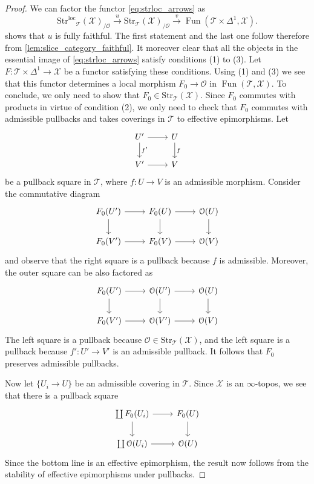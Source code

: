 \documentclass[12pt,a4paper,reqno]{amsart}
\theoremstyle{plain}
\theoremstyle{definition}
\theoremstyle{remark}
\numberwithin{equation}{section}
\begin{document}
\begin{proof}
	We can factor the functor \eqref{eq:strloc_arrows} as 
	\[ {\mathrm{Str}^\mathrm{loc}}_{\mathcal T}({\mathcal X})_{/{\mathcal O}} \xrightarrow{u} {\mathrm{Str}}_{\mathcal T}({\mathcal X})_{/{\mathcal O}} \xrightarrow{v} \operatorname{Fun}({\mathcal T} \times \Delta^1, {\mathcal X}) . \]
	 shows that $u$ is fully faithful. The first statement and the last one follow therefore from \cref{lem:slice_category_faithful}.
	It moreover clear that all the objects in the essential image of \eqref{eq:strloc_arrows} satisfy conditions (1) to (3).
	Let $F \colon {\mathcal T} \times \Delta^1 \to {\mathcal X}$ be a functor satisfying these conditions. Using (1) and (3) we see that this functor determines a local morphism $F_0 \to {\mathcal O}$ in $\operatorname{Fun}({\mathcal T}, {\mathcal X})$.
	To conclude, we only need to show that $F_0 \in {\mathrm{Str}}_{\mathcal T}({\mathcal X})$. Since $F_0$ commutes with products in virtue of condition (2), we only need to check that $F_0$ commutes with admissible pullbacks and takes coverings in ${\mathcal T}$ to effective epimorphisms.
	Let
	\[ \begin{tikzcd}
	U' \arrow{r} \arrow{d}{f'} & U \arrow{d}{f} \\
	V' \arrow{r} & V
	\end{tikzcd} \]
	be a pullback square in ${\mathcal T}$, where $f \colon U \to V$ is an admissible morphism.
	Consider the commutative diagram
	\[ \begin{tikzcd}
	F_0(U') \arrow{r} \arrow{d} & F_0(U) \arrow{d} \arrow{r} & {\mathcal O}(U) \arrow{d} \\
	F_0(V') \arrow{r} & F_0(V) \arrow{r} & {\mathcal O}(V)
	\end{tikzcd} \]
	and observe that the right square is a pullback because $f$ is admissible.
	Moreover, the outer square can be also factored as
	\[ \begin{tikzcd}
	F_0(U') \arrow{r} \arrow{d} & {\mathcal O}(U') \arrow{r} \arrow{d} & {\mathcal O}(U) \arrow{d} \\
	F_0(V') \arrow{r} & {\mathcal O}(V') \arrow{r} & {\mathcal O}(V)
	\end{tikzcd} \]
	The left square is a pullback because ${\mathcal O} \in {\mathrm{Str}}_{\mathcal T}({\mathcal X})$, and the left square is a pullback because $f' \colon U' \to V'$ is an admissible pullback.
	It follows that $F_0$ preserves admissible pullbacks.
	
	Now let $\{U_i \to U\}$ be an admissible covering in ${\mathcal T}$. Since ${\mathcal X}$ is an $\infty$-topos, we see that there is a pullback square
	\[ \begin{tikzcd}
	\coprod F_0(U_i) \arrow{r} \arrow{d} & F_0(U) \arrow{d} \\
	\coprod {\mathcal O}(U_i) \arrow{r} & {\mathcal O}(U)
	\end{tikzcd} \]
	Since the bottom line is an effective epimorphism, the result now follows from the stability of effective epimorphisms under pullbacks.
\end{proof}
\end{document}
